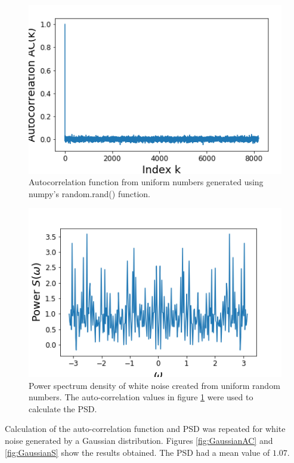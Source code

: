 \documentclass[twocolumn]{article}
\begin{document}
\begin{figure}
\centering
\includegraphics[width=\linewidth]{uniformAC}
\caption{Autocorrelation function from uniform numbers generated using numpy's random.rand() function.}
\label{fig:uniformAC}
\end{figure}

\begin{figure}
\centering
\includegraphics[width=\linewidth]{uniformS}
\caption{Power spectrum density of white noise created from uniform random numbers. The auto-correlation values in figure \ref{fig:uniformAC} were used to calculate the PSD.}
\label{fig:uniformS}
\end{figure}

Calculation of the auto-correlation function and PSD was repeated for white noise generated by a Gaussian distribution. Figures \ref{fig:GaussianAC} and \ref{fig:GaussianS} show the results obtained. The PSD had a mean value of $1.07$.
\end{document}
